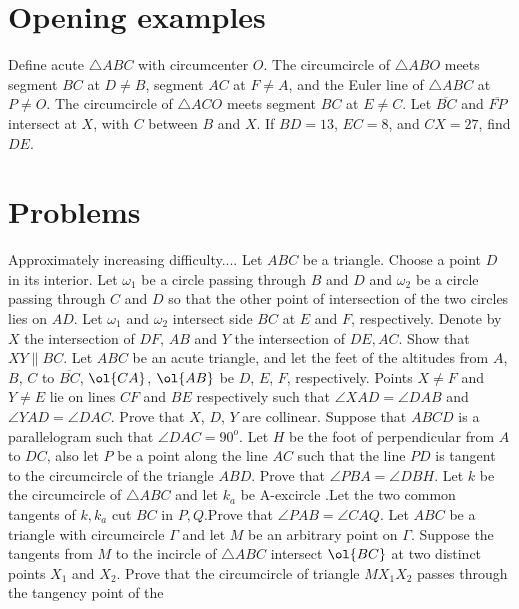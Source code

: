 \documentclass{seto}
\begin{document}
\section{Opening examples}
\begin{block}
Define acute $\triangle ABC$ with circumcenter $O$. The circumcircle of $\triangle ABO$ meets segment $BC$ at $D \ne B$, segment $AC$ at $F \ne A$, and the Euler line of $\triangle ABC$ at $P \ne O$. The circumcircle of $\triangle ACO$ meets segment $BC$ at $E \ne C$. Let $\overline{BC}$ and $\overline{FP}$ intersect at $X$, with $C$ between $B$ and $X$. If $BD=13$, $EC=8$, and $CX=27$, find $DE$.
\end{block}

\section{Problems}
Approximately increasing difficulty....
 Let $ABC$ be a triangle. Choose a point $D$ in its interior. Let $\omega_1$ be a circle passing through $B$ and $D$ and $\omega_2$ be a circle passing through $C$ and $D$ so that the other point of intersection of the two circles lies on $AD$. Let $\omega_1$ and $\omega_2$ intersect side $BC$ at $E$ and $F$, respectively. Denote by $X$ the intersection of $DF$, $AB$ and $Y$ the intersection of $DE, AC$. Show that $XY \parallel BC$.
\exercise[CJMO 2021/1]Let $ABC$ be an acute triangle, and let the feet of the altitudes from $A$, $B$, $C$ to $\overline{BC}$, $\ol{CA}$, $\ol{AB}$ be $D$, $E$, $F$, respectively. Points $X\neq F$ and $Y\neq E$ lie on lines $CF$ and $BE$ respectively such that $\angle XAD = \angle DAB$ and $\angle YAD = \angle DAC$. Prove that $X$, $D$, $Y$
are collinear.
\exercise[IGO 2018/I5]Suppose that $ABCD$ is a parallelogram such that $\angle DAC = 90^o$. Let $H$ be the foot of perpendicular from $A$ to $DC$, also let $P$ be a point along the line $AC$ such that the line $PD$ is tangent to the circumcircle of the triangle $ABD$. Prove that $\angle PBA = \angle DBH$. 
\exercise[Serbia 2017/6] Let $k$ be the circumcircle of $\triangle ABC$ and let $k_a$ be A-excircle .Let the two common tangents of $k,k_a$ cut $BC$ in $P,Q$.Prove that $\angle PAB=\angle CAQ$.
Let $ABC$ be a triangle with circumcircle $\Gamma$ and let $M$ be an arbitrary point on $\Gamma$. Suppose the tangents from $M$ to the incircle of 
$\triangle ABC$ intersect $\ol{BC}$ at two distinct points $X_1$ and $X_2$. Prove that the circumcircle of triangle $MX_1X_2$ passes through the tangency point of the 
\end{document}
